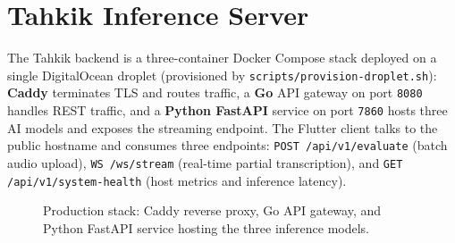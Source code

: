 \chapter{Tahkik Inference Server}
\label{app:server}

The Tahkik backend is a three-container Docker Compose stack deployed on a
single DigitalOcean droplet (provisioned by \texttt{scripts/provision-droplet.sh}):
\textbf{Caddy} terminates TLS and routes traffic, a \textbf{Go} API
gateway on port \texttt{8080} handles REST traffic, and a \textbf{Python
FastAPI} service on port \texttt{7860} hosts three AI models and exposes
the streaming endpoint. The Flutter client talks to the public hostname
and consumes three endpoints: \texttt{POST /api/v1/evaluate} (batch
audio upload), \texttt{WS /ws/stream} (real-time partial transcription),
and \texttt{GET /api/v1/system-health} (host metrics and inference
latency).

\begin{figure}[H]
\centering
{}
\caption{Production stack: Caddy reverse proxy, Go API gateway, and Python
FastAPI service hosting the three inference models.}
\label{fig:app_server_arch}
\end{figure}

